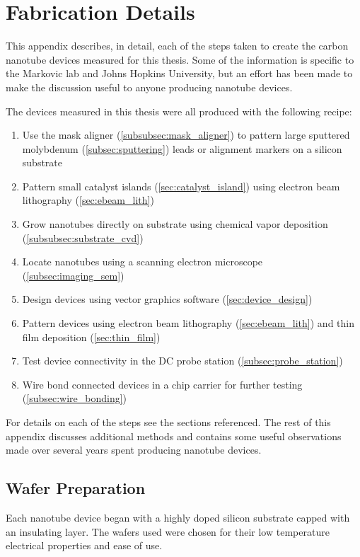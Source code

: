 \chapter{Fabrication Details}
\label{chap:fabrication}

This appendix describes, in detail, each of the steps taken to create the carbon nanotube devices measured for this thesis. Some of the information is specific to the Markovic lab and Johns Hopkins University, but an effort has been made to make the discussion useful to anyone producing nanotube devices.

The devices measured in this thesis were all produced with the following recipe:

\begin{enumerate}
\item Use the mask aligner (\ref{subsubsec:mask_aligner}) to pattern large sputtered molybdenum (\ref{subsec:sputtering}) leads or alignment markers on a silicon substrate
\item Pattern small catalyst islands (\ref{sec:catalyst_island}) using electron beam lithography (\ref{sec:ebeam_lith})
\item Grow nanotubes directly on substrate using chemical vapor deposition (\ref{subsubsec:substrate_cvd})
\item Locate nanotubes using a scanning electron microscope (\ref{subsec:imaging_sem})
\item Design devices using vector graphics software (\ref{sec:device_design})
\item Pattern devices using electron beam lithography (\ref{sec:ebeam_lith}) and thin film deposition (\ref{sec:thin_film})
\item Test device connectivity in the DC probe station (\ref{subsec:probe_station})
\item Wire bond connected devices in a chip carrier for further testing (\ref{subsec:wire_bonding})
\end{enumerate}

For details on each of the steps see the sections referenced. The rest of this appendix discusses additional methods and contains some useful observations made over several years spent producing nanotube devices.

\section{Wafer Preparation}

Each nanotube device began with a highly doped silicon substrate capped with an insulating layer. The wafers used were chosen for their low temperature electrical properties and ease of use.

